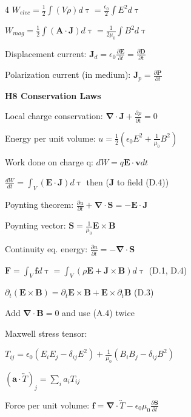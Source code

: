 \documentclass[a4paper,twoside]{article}
\newcommand{\secblock}[1]{%
\par\vspace{1.8pt}%
\noindent\colorbox{hdrcol}{\parbox[c][1.0em][c]{0.98\linewidth}{\color{white}\bfseries\small #1}}\par
\vspace{1pt}%
}
\begin{document}
\begin{multicols*}{4}
\(W_{elec} = \frac{1}{2} \int  (V \rho) d\uptau = \frac{\epsilon_0}{2} \int  E^2 d\uptau\)

\(W_{mag} = \frac{1}{2} \int (\bm A \cdot \bm J) d\uptau = \frac{1}{2\mu_0} \int B^2 d\uptau\)

Displacement current:
\(\bm J_d = \epsilon_0 \frac{\partial \bm E}{\partial t} =  \frac{\partial \bm D}{\partial t}\)

Polarization current (in medium):
\(\bm J_p = \frac{\partial \bm P}{\partial t}\)



\secblock{H8 Conservation Laws}

Local charge conservation:
\(\bm \nabla \cdot \bm J + \frac{\partial \rho}{\partial t} = 0\)


Energy per unit volume:
\(u = \frac{1}{2} (\epsilon_0 E^2 + \frac{1}{\mu_0} B^2)\)

Work done on charge q:
\(dW = q \bm E \cdot \bm v dt\)

\(\frac{dW}{dt} = \int_{V} (\bm E \cdot \bm J) d\uptau\) then (\(\bm J \) to field (D.4))

Poynting theorem:
\(\frac{\partial u}{\partial t} + \bm \nabla \cdot \bm S = -\bm E \cdot \bm J\)

Poynting vector:
\(\bm S = \frac{1}{\mu_0} \bm E \times \bm B\)

Continuity eq. energy:
\(\frac{\partial u}{\partial t} = -\bm \nabla \cdot \bm S \)


\(\bm F = \int_V \bm f d\uptau = \int_V (\rho \bm E + \bm J \times \bm B) d\uptau \) (D.1, D.4)

\(
\partial_t (\bm E \times \bm B) = \partial_t\bm E \times \bm B + \bm E \times \partial_t \bm B
\) (D.3)

Add \(\bm \nabla \cdot \bm B=0\) and use (A.4) twice


Maxwell stress tensor:

\(T_{ij} = \epsilon_0 (E_iE_j-\delta_{ij}E^2) +\frac{1}{\mu_0} (B_iB_j-\delta_{ij}B^2)\)

\((\bm a \cdot \overleftrightarrow{T})_j = \sum_i a_i T_{ij}\)

Force per unit volume:
\(\bm f = \bm\nabla \cdot \overleftrightarrow{T} - \epsilon_0 \mu_0 \frac{\partial \bm S}{\partial t}\)



\end{multicols*}
\end{document}
